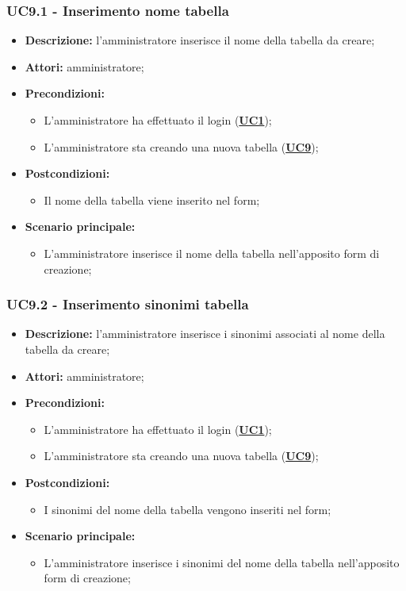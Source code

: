 \subsubsection{UC9.1 - Inserimento nome tabella}
\label{sec:UC9.1}
\begin{itemize}
	\item \textbf{Descrizione:} l’amministratore inserisce il nome della tabella da creare;
	\item \textbf{Attori:} amministratore;
	\item \textbf{Precondizioni:} 
	\begin{itemize}
		\item L’amministratore ha effettuato il login (\hyperref[sec:UC1]{\textbf{UC1}});
		\item L’amministratore sta creando una nuova tabella (\hyperref[sec:UC9]{\textbf{UC9}});
	\end{itemize}
	\item \textbf{Postcondizioni:} 
	\begin{itemize}
		\item Il nome della tabella viene inserito nel form;
	\end{itemize}
	\item \textbf{Scenario principale:} 
	\begin{itemize}
		\item L’amministratore inserisce il nome della tabella nell'apposito form di creazione;
	\end{itemize}
\end{itemize}

\subsubsection{UC9.2 - Inserimento sinonimi tabella}
\label{sec:UC9.2}
\begin{itemize}
	\item \textbf{Descrizione:} l’amministratore inserisce i sinonimi associati al nome della tabella da creare;
	\item \textbf{Attori:} amministratore;
	\item \textbf{Precondizioni:} 
	\begin{itemize}
		\item L’amministratore ha effettuato il login (\hyperref[sec:UC1]{\textbf{UC1}});
		\item L’amministratore sta creando una nuova tabella (\hyperref[sec:UC9]{\textbf{UC9}});
	\end{itemize}
	\item \textbf{Postcondizioni:} 
	\begin{itemize}
		\item I sinonimi del nome della tabella vengono inseriti nel form;
	\end{itemize}
	\item \textbf{Scenario principale:} 
	\begin{itemize}
		\item L’amministratore inserisce i sinonimi del nome della tabella nell'apposito form di creazione;
	\end{itemize}
\end{itemize}

